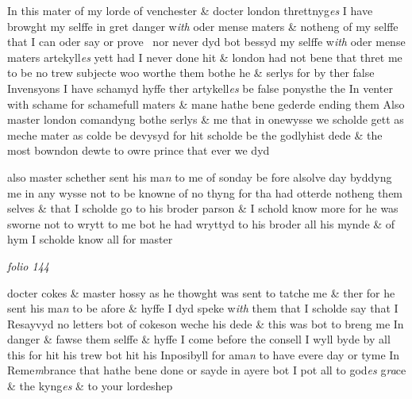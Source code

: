 \documentclass[12pt, a4paper]{book}
\begin{document}
 	
 		
				\marginpar[\vspace{0.5cm}{\textcolor{Gray}{n}}]{}
			
 		
		\ifthenelse{\isodd{\thepage}}
		{\reversemarginpar}
		{\normalmarginpar}
		In this mater of my lorde of venchester \& docter london threttnyg\textit{es} I
 have browght my selffe in gret danger w\textit{ith} oder mense maters \&
 notheng of my selffe that I can oder say or prove  nor never dyd bot bessyd
 my selffe w\textit{ith} oder mense maters artekyll\textit{es} yett had I never done hit \&
 			london had not bene that thret me to be no trew subjecte woo
 worthe them bothe he \& serlys for by ther false Invensyons I have
 schamyd hyffe ther artykell\textit{es} be false
			 ponysthe the In venter with schame
 for schamefull maters \& mane hathe bene gederde ending them
 Also master london comandyng bothe serlys \& me that in onewysse
 we scholde gett as meche mater as colde be devysyd for hit scholde be
 the godlyhist dede \& the most bowndon dewte to owre prince that ever we
 dyd
 	
 		
				\marginpar[\vspace{0.5cm}{\textcolor{Gray}{Shetheres servaunt}}]{}
			
 	
				\marginpar[\vspace{0.5cm}{\textcolor{Gray}{n}}]{}
			
 	
		\ifthenelse{\isodd{\thepage}}
		{\reversemarginpar}
		{\normalmarginpar}
		
 	also master schether sent his ma\textit{n} to me of sonday be fore alsolve day
 byddyng me in any wysse not to be knowne of no thyng for tha had
 otterde notheng them selves \& that I scholde go to his broder parson
			 \& I schold
 know more for he was sworne not to wrytt to me bot he had wryttyd
 to his broder all his mynde \& of hym I scholde know all for master

\dotfill
					

\textit{folio 144}


 	
		\ifthenelse{\isodd{\thepage}}
		{\reversemarginpar}
		{\normalmarginpar}
		docter cokes \& master hossy as he thowght was sent to tatche me \& ther
 for he sent his ma\textit{n} to be afore \& hyffe I dyd speke w\textit{ith} them that I scholde
 say that I Resayvyd no letters bot of cokeson weche his dede \& this
 was bot to breng me In danger \& fawse them selffe \& hyffe I come
 before the consell I wyll byde by all this for hit his trew bot hit
 his Inposibyll for ama\textit{n} to have evere day or tyme In Reme\textit{m}brance
 that hathe bene done or sayde in ayere bot I pot all to god\textit{es} g\textit{ra}ce
 		\& the kyng\textit{es} \& to
			 your lordeshep
 	
\end{document}
